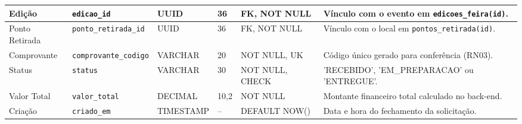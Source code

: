 \documentclass[12pt,a4paper]{article}
\begin{document}
\begin{spacing}{1.0}
\begin{tabularx}{\textwidth}{|p{1.6cm}|p{1.9cm}|p{1.2cm}|p{0.7cm}|p{1.9cm}|X|}
Edição & \texttt{edicao\_id} & UUID & 36 & FK, NOT NULL & Vínculo com o evento em \texttt{edicoes\_feira(id)}. \\ \hline

Ponto Retirada & \texttt{ponto\_retirada\_id} & UUID & 36 & FK, NOT NULL & Vínculo com o local em \texttt{pontos\_retirada(id)}. \\ \hline

Comprovante & \texttt{comprovante\_codigo} & VARCHAR & 20 & NOT NULL, UK & Código único gerado para conferência (RN03). \\ \hline

Status & \texttt{status} & VARCHAR & 30 & NOT NULL, CHECK & 'RECEBIDO', 'EM\_PREPARACAO' ou 'ENTREGUE'. \\ \hline

Valor Total & \texttt{valor\_total} & DECIMAL & 10,2 & NOT NULL & Montante financeiro total calculado no back-end. \\ \hline

Criação & \texttt{criado\_em} & TIMESTAMP & -- & DEFAULT NOW() & Data e hora do fechamento da solicitação. \\ \hline

\end{tabularx}

\end{spacing}

\vspace{0.6cm}

\end{document}
